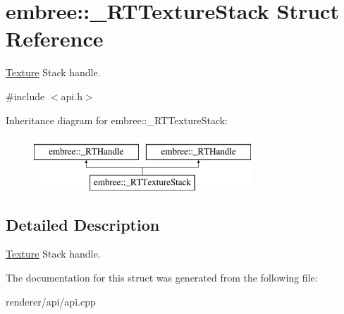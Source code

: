 \hypertarget{structembree_1_1___r_t_texture_stack}{
\section{embree::\_\-RTTextureStack Struct Reference}
\label{structembree_1_1___r_t_texture_stack}
}


\hyperlink{classembree_1_1_texture}{Texture} Stack handle.  




{\ttfamily \#include $<$api.h$>$}

Inheritance diagram for embree::\_\-RTTextureStack:\begin{figure}[H]
\begin{center}
\leavevmode
\includegraphics[height=2.000000cm]{structembree_1_1___r_t_texture_stack}
\end{center}
\end{figure}


\subsection{Detailed Description}
\hyperlink{classembree_1_1_texture}{Texture} Stack handle. 

The documentation for this struct was generated from the following file:\begin{DoxyCompactItemize}
\item 
renderer/api/api.cpp\end{DoxyCompactItemize}

